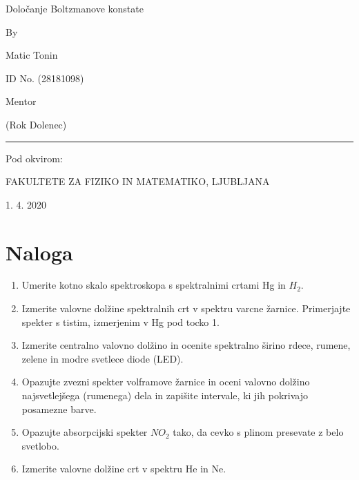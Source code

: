 \documentclass[11pt, a4paper]{article}
\theoremstyle{definition}
\theoremstyle{example}
\theoremstyle{izrek}
\begin{document}
\begin{center}
\thispagestyle{empty}
\parskip=14pt%
\vspace*{3\parskip}%
\begin{Huge} Določanje Boltzmanove konstate \end{Huge}

By

Matic Tonin

ID No. (28181098)

Mentor 

(Rok Dolenec)

\rule{7cm}{0.4pt}

Pod okvirom:

FAKULTETE ZA FIZIKO IN MATEMATIKO, LJUBLJANA

1. 4. 2020

\end{center}
\pagebreak
\section{Naloga}
\begin{enumerate}
\item Umerite kotno skalo spektroskopa s spektralnimi crtami Hg in $H_2$.
\item Izmerite valovne dolžine spektralnih crt v spektru varcne žarnice. Primerjajte spekter
s tistim, izmerjenim v Hg pod tocko 1.
\item Izmerite centralno valovno dolžino in ocenite spektralno širino rdece, rumene, zelene
in modre svetlece diode (LED).
\item Opazujte zvezni spekter volframove žarnice in oceni valovno dolžino najsvetlejšega
(rumenega) dela in zapišite intervale, ki jih pokrivajo posamezne barve.
\item  Opazujte absorpcijski spekter $NO_2$ tako, da cevko s plinom presevate z belo svetlobo.
\item Izmerite valovne dolžine crt v spektru He in Ne.
\end{enumerate}
\end{document}
